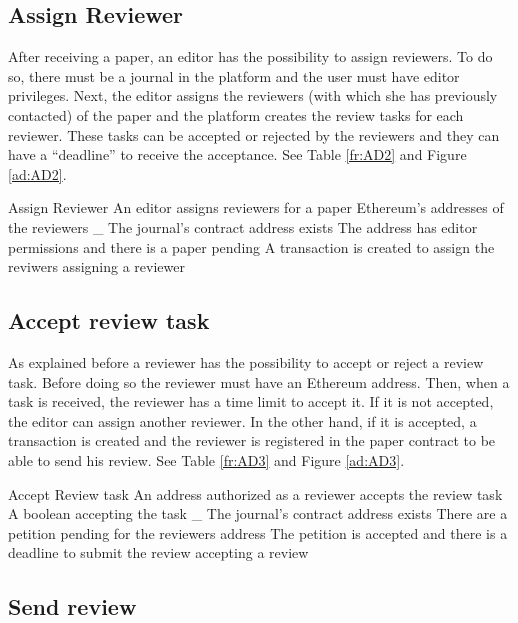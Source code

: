 \subsection*{Assign Reviewer}

After receiving a paper, an editor has the possibility to assign reviewers. To
do so, there must be a journal in the platform and the user must have editor
privileges. Next, the editor assigns the reviewers (with which she has
previously contacted) of the paper and the platform creates the review tasks for
each reviewer. These tasks can be accepted or rejected by the reviewers and they
can have a ``deadline'' to receive the acceptance. See Table \ref{fr:AD2} and Figure \ref{ad:AD2}.

{Assign Reviewer}%
{An editor assigns reviewers for a paper}%
{Ethereum's addresses of the reviewers}%
{_}%
{The journal's contract address exists} {The address has editor permissions and
  there is a paper pending}%
{A transaction is created to assign the reviwers}%
{assigning a reviewer}%

\subsection*{Accept review task}

As explained before a reviewer has the possibility to accept or reject a review
task. Before doing so the reviewer must have an Ethereum address. Then, when a
task is received, the reviewer has a time limit to accept it. If it is not
accepted, the editor can assign another reviewer. In the other hand, if it is
accepted, a transaction is created and the reviewer is registered in the paper
contract to be able to send his
review. See Table \ref{fr:AD3} and Figure \ref{ad:AD3}.

{Accept Review task}%
{An address authorized as a reviewer accepts the review
  task}%
{A boolean accepting the task}%
{_}%
{The journal's contract address exists}%
{There are a petition pending for the reviewers address}%
{The petition is accepted and there is a deadline to submit the
  review}%
{accepting a review}%

\subsection*{Send review}

